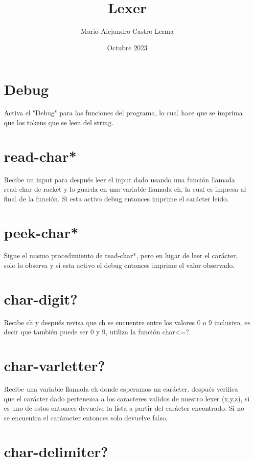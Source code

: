 \documentclass{article}
\title{Lexer}
\author{Mario Alejandro Castro Lerma}
\date{Octubre 2023}
\begin{document}
\maketitle

\section{Debug}

Activa el "Debug" para las funciones del programa, lo cual hace que se imprima que los tokens que se leen del string.

\section{read-char*}

Recibe un input para después leer el input dado usando una función llamada read-char de racket y lo guarda en una variable llamada ch, la cual es impresa al final de la función. Si esta activo debug entonces imprime el carácter leído.

\section{peek-char*}

Sigue el mismo procedimiento de read-char*, pero en lugar de leer el carácter, solo lo observa y si esta activo el debug entonces imprime el valor observado.

\section{char-digit?}

Recibe ch y después revisa que ch se encuentre entre los valores 0 o 9 inclusivo, es decir que también puede ser 0 y 9, utiliza la función char<=?.

\section{char-varletter?}

Recibe una variable llamada ch donde esperamos un carácter, después verifica que el carácter dado pertenezca a los caracteres validos de nuestro lexer (x,y,z), si es uno de estos entonces devuelve la lista a partir del carácter encontrado. Si no se encuentra el caráracter entonces solo devuelve falso.

\newpage
\section{char-delimiter?}
\end{document}
